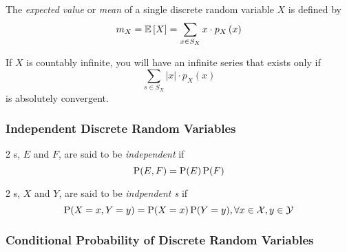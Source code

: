 \begin{definition}\label{def:Expected_Value_of_Single_Discrete}
  The \emph{expected value} or \emph{mean} of a single discrete random variable $X$ is defined by
  \begin{equation}\label{eq:Expected_Value_of_Single_Discrete}
    m_{X} = \operatorname{\operatorname{\mathbb{E}}} \left[ X \right] = \sum_{x \in S_{X}} x \cdot p_{X} \left( x \right)
  \end{equation}
  \begin{remark}\label{rmk:Expected_Value_of_Single_Discrete_Countably_Infinite}
    If $X$ is countably infinite, you will have an infinite series that exists only if
    \begin{equation}\label{eq:Expected_Value_of_Single_Discrete_Countably_Infinite}
      \sum_{s \in S_{X}} \lvert x \rvert \cdot p_{X} \left( x \right)
    \end{equation}
    is absolutely convergent.
  \end{remark}
\end{definition}

\subsubsection{Independent Discrete Random Variables}\label{subsubsec:Independent_Discrete_Random_Variables}
\begin{definition}[Independent]\label{def:Independent}
  2 s, $E$ and $F$, are said to be \emph{independent} if
  \begin{equation}\label{eq:Independent}
    \operatorname{\operatorname{P}}(E,F) = \operatorname{\operatorname{P}}(E) \operatorname{\operatorname{P}}(F)
  \end{equation}

  2 s, $X$ and $Y$, are said to be \emph{indpendent s} if
  \begin{equation}\label{eq:Independent_Random_Variables}
    \operatorname{\operatorname{P}}(X=x, Y=y) = \operatorname{\operatorname{P}}(X=x) \operatorname{\operatorname{P}}(Y=y), \forall x \in \mathcal{X}, y \in \mathcal{Y}
  \end{equation}
\end{definition}

\subsubsection{Conditional Probability of  Discrete Random Variables}\label{subsubsec:Conditional_Probability_Discrete_Random_Variables}

